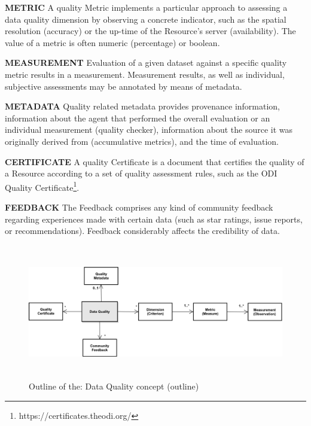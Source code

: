 \textbf{METRIC} A quality Metric implements a particular approach to assessing a data quality dimension by observing a concrete indicator, such as the spatial resolution (accuracy) or the up-time of the Resource’s server (availability). The value of a metric is often numeric (percentage) or boolean. 

\textbf{MEASUREMENT} Evaluation of a given dataset against a specific quality metric results in a measurement. Measurement results, as well as individual, subjective assessments may be annotated by means of metadata. 

\textbf{METADATA} Quality related metadata provides provenance information, information about the agent that performed the overall evaluation or an individual measurement (quality checker), information about the source it was originally derived from (accumulative metrics), and the time of evaluation.

\textbf{CERTIFICATE} A quality Certificate is a document that certifies the quality of a Resource according to a set of quality assessment rules, such as the ODI Quality Certificate\footnote{https://certificates.theodi.org/ }. 

\textbf{FEEDBACK }The Feedback comprises any kind of community feedback regarding experiences made with certain data (such as star ratings, issue reports, or recommendations). Feedback considerably affects the credibility of data.




\begin{figure}[H]
	\begin{Center}
		\includegraphics[width=6.53in,height=2.31in]{./media/image45.png}
		\caption{Outline of the: Data Quality concept (outline)}
		\label{fig:Outline_of_the_Data_Quality_concept_outline}
	\end{Center}
\end{figure}



